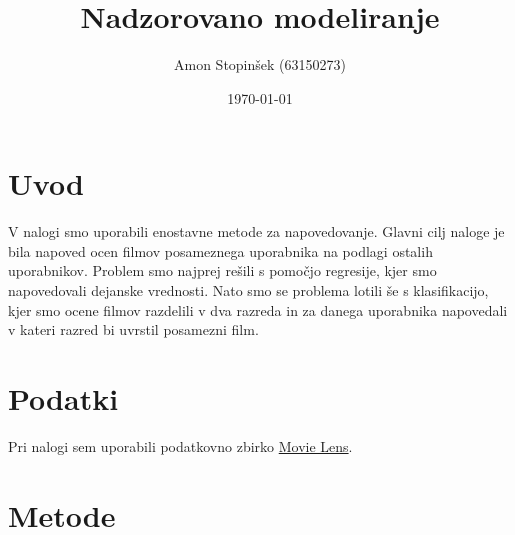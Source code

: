 \documentclass[a4paper,11pt]{article}
\title{Nadzorovano modeliranje}
\author{Amon Stopinšek (63150273)}
\date{\today}
\begin{document}
\maketitle

\section{Uvod}

V nalogi smo uporabili enostavne metode za napovedovanje. Glavni cilj naloge
je bila napoved ocen filmov posameznega uporabnika na podlagi ostalih uporabnikov.
Problem smo najprej rešili s pomočjo regresije, kjer smo napovedovali dejanske
vrednosti. Nato smo se problema lotili še s klasifikacijo, kjer smo ocene filmov
razdelili v dva razreda in za danega uporabnika napovedali v kateri razred bi
uvrstil posamezni film.

\section{Podatki}


Pri nalogi sem uporabili podatkovno zbirko
\href{https://grouplens.org/datasets/movielens/}{Movie Lens}.

\section{Metode}
\end{document}
